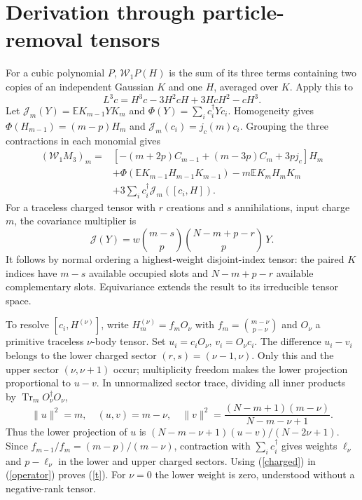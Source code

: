 \documentclass[11pt,a4paper]{article}
\newcommand{\W}{\mathcal W}
\begin{document}
\newpage
\section{Derivation through particle-removal tensors}
For a cubic polynomial $P$, $\W_1P(H)$ is the sum of its three
terms containing two copies of an independent Gaussian $K$ and
one $H$, averaged over $K$. Apply this to
\[
 L^3c=H^3c-3H^2cH+3HcH^2-cH^3 .
\]
Let
$\mathcal J_m(Y)=\mathbb E K_{m-1}YK_m$ and
$\Phi(Y)=\sum_i c_i^\dagger Yc_i$.
Homogeneity gives $\Phi(H_{m-1})=(m-p)H_m$ and
$\mathcal J_m(c_i)=j_c(m)c_i$. Grouping the three contractions
in each monomial gives
\begin{align}
 (\W_1M_3)_m={}&
 [-(m+2p)C_{m-1}+(m-3p)C_m+3p j_c]H_m \nonumber\\
 &+\Phi(\mathbb E K_{m-1}H_{m-1}K_{m-1})
      -m\mathbb E K_mH_mK_m \nonumber\\
 &+3\sum_i c_i^\dagger\mathcal J_m([c_i,H]).
                                                               \label{operator}
\end{align}
For a traceless charged tensor with $r$ creations and $s$ annihilations,
input charge $m$, the covariance multiplier is
\begin{equation}
 \mathcal J(Y)=
 w\binom{m-s}{p}\binom{N-m+p-r}{p}\,Y.                \label{charged}
\end{equation}
It follows by normal ordering a highest-weight disjoint-index
tensor: the paired $K$ indices have $m-s$ available occupied
slots and $N-m+p-r$ available complementary slots. Equivariance
extends the result to its irreducible tensor space.

To resolve $[c_i,H^{(\nu)}]$, write
$H_m^{(\nu)}=f_m O_\nu$ with
$f_m=\binom{m-\nu}{p-\nu}$ and $O_\nu$ a primitive traceless
$\nu$-body tensor. Set $u_i=c_iO_\nu$, $v_i=O_\nu c_i$.
The difference $u_i-v_i$ belongs to the lower charged sector
$(r,s)=(\nu-1,\nu)$. Only this and the upper sector
$(\nu,\nu+1)$ occur; multiplicity freedom makes the lower
projection proportional to $u-v$.
In unnormalized sector trace, dividing
all inner products by $\operatorname{Tr}_m O_\nu^\dagger O_\nu$,
\[
 \|u\|^2=m,\quad (u,v)=m-\nu,\quad
 \|v\|^2=\frac{(N-m+1)(m-\nu)}{N-m-\nu+1}.
\]
Thus the lower projection of $u$ is
$(N-m-\nu+1)(u-v)/(N-2\nu+1)$.
Since $f_{m-1}/f_m=(m-p)/(m-\nu)$, contraction with
$\sum_i c_i^\dagger$ gives weights
$\ell_\nu$ and $p-\ell_\nu$ in the lower and upper charged
sectors. Using (\ref{charged}) in (\ref{operator}) proves
(\ref{t}). For $\nu=0$ the lower weight is zero, understood
without a negative-rank tensor.
\end{document}
